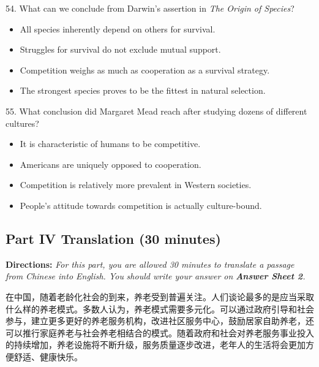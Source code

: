 \documentclass[UTF8,11pt]{ctexart}
\begin{document}
54. What can we conclude from Darwin’s assertion in \textit{The Origin of Species}?


\begin{itemize}[leftmargin=2em,itemsep=.2em,topsep=.4em]\item[A.] All species inherently depend on others for survival.
\item[B.] Struggles for survival do not exclude mutual support.
\item[C.] Competition weighs as much as cooperation as a survival strategy.
\item[D.] The strongest species proves to be the fittest in natural selection.
\end{itemize}

55. What conclusion did Margaret Mead reach after studying dozens of different cultures?


\begin{itemize}[leftmargin=2em,itemsep=.2em,topsep=.4em]\item[A.] It is characteristic of humans to be competitive.
\item[B.] Americans are uniquely opposed to cooperation.
\item[C.] Competition is relatively more prevalent in Western societies.
\item[D.] People’s attitude towards competition is actually culture-bound.
\end{itemize}

\subsection*{\textbf{Part IV Translation (30 minutes)}}


\textbf{Directions: }\textit{For this part, you are allowed 30 minutes to translate a passage from Chinese into English. You} \textit{should write your answer on }\textbf{\textit{Answer Sheet 2}}\textit{.}


在中国，随着老龄化社会的到来，养老受到普遍关注。人们谈论最多的是应当采取什么样的养老模式。多数人认为，养老模式需要多元化。可以通过政府引导和社会参与，建立更多更好的养老服务机构，改进社区服务中心，鼓励居家自助养老，还可以推行家庭养老与社会养老相结合的模式。随着政府和社会对养老服务事业投入的持续增加，养老设施将不断升级，服务质量逐步改进，老年人的生活将会更加方便舒适、健康快乐。
\end{document}
